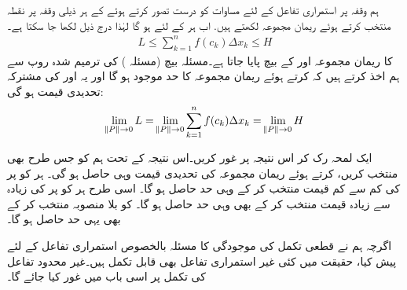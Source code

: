 ہم  وقفہ  پر استمراری تفاعل  کے لئے مساوات  کو درست تصور کرتے ہوئے   کے ہر  ذیلی وقفہ  پر نقطہ  منتخب کرتے ہوئے  ریمان مجموعہ  لکھتے ہیں. اب ہر  کے لئے  ہو گا لہٰذا درج ذیل لکھا جا سکتا ہے۔
\begin{align*}
L\le \sum\limits_{k=1}^nf(c_k)\Delta x_k\le H
\end{align*}
 کا ریمان مجموعہ  اور  کے بیچ پایا جاتا ہے۔مسئلہ بیچ (مسئلہ )  کی ترمیم شدہ روپ سے ہم اخذ کرتے ہیں کہ  کرتے ہوئے ریمان مجموعہ کا حد موجود ہو گا اور یہ  اور  کی مشترکہ تحدیدی قیمت ہو گی:
\begin{align*}
\lim_{\norm{P}\to0}L=\lim_{\norm{P}\to0}\sum\limits_{k=1}^nf(c_k)\Delta x_k=\lim_{\norm{P}\to0}H
\end{align*}

ایک لمحہ رک کر اس نتیجہ پر غور کریں۔اس نتیجہ کے تحت ہم  کو جس طرح بھی منتخب کریں،  کرتے ہوئے ریمان مجموعہ کی تحدیدی قیمت وہی حاصل ہو گی۔ ہر  کو  پر  کی کم سے کم قیمت منتخب کر کے وہی حد حاصل ہو گا۔ اسی طرح ہر  کو  پر  کی زیادہ سے زیادہ  قیمت منتخب کر کے بھی وہی حد حاصل ہو گا۔   کو بلا منصوبہ منتخب کر کے بھی یہی حد حاصل ہو گا۔

اگرچہ ہم نے قطعی تکمل کی موجودگی کا مسئلہ بالخصوص استمراری تفاعل کے لئے پیش کیا، حقیقت میں کئی غیر استمراری تفاعل بھی قابل تکمل ہیں۔غیر محدود تفاعل کی تکمل پر اسی باب میں غور کیا جائے گا۔

